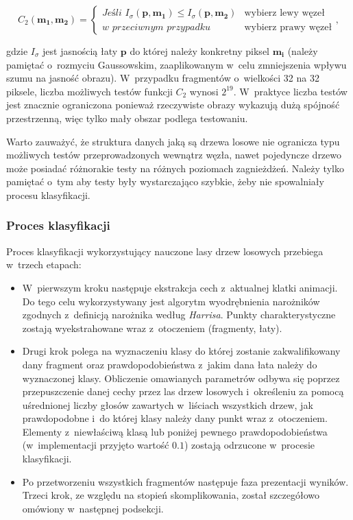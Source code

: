     \[
      C_{2}(\mathbf{m_{1}}, \mathbf{m_{2}}) = \begin{cases}
        \textit{Jeśli } I_{\sigma}(\mathbf{p}, \mathbf{m_{1}}) \leq I_{\sigma}(\mathbf{p}, \mathbf{m_{2}}) & \text{wybierz lewy węzeł} \\
        \textit{w~przeciwnym przypadku} & \text{wybierz prawy węzeł}
      \end{cases},
    \]

    gdzie $I_{\sigma}$ jest jasnością łaty $\mathbf{p}$ do której należy konkretny piksel $\mathbf{m_{i}}$ (należy pamiętać o~rozmyciu Gaussowskim, zaaplikowanym w~celu zmniejszenia wpływu szumu na jasność obrazu). W~przypadku fragmentów o~wielkości 32 na 32 piksele, liczba możliwych testów funkcji $C_{2}$ wynosi $2^{19}$. W~praktyce liczba testów jest znacznie ograniczona ponieważ rzeczywiste obrazy wykazują dużą spójność przestrzenną, więc tylko mały obszar podlega testowaniu.

    Warto zauważyć, że struktura danych jaką są drzewa losowe nie ogranicza typu możliwych testów przeprowadzonych wewnątrz węzła, nawet pojedyncze drzewo może posiadać różnorakie testy na różnych poziomach zagnieżdżeń. Należy tylko pamiętać o~tym aby testy były wystarczająco szybkie, żeby nie spowalniały procesu klasyfikacji.

    \subsubsection{Proces klasyfikacji}
    Proces klasyfikacji wykorzystujący nauczone lasy drzew losowych przebiega w~trzech etapach:
    \begin{itemize}
      \item W~pierwszym kroku następuje ekstrakcja cech z~aktualnej klatki animacji. Do tego celu wykorzystywany jest algorytm wyodrębnienia narożników zgodnych z~definicją narożnika według \textit{Harrisa}. Punkty charakterystyczne zostają wyekstrahowane wraz z~otoczeniem (fragmenty, łaty).
      \item Drugi krok polega na wyznaczeniu klasy do której zostanie zakwalifikowany dany fragment oraz prawdopodobieństwa z~jakim dana łata należy do wyznaczonej klasy. Obliczenie omawianych parametrów odbywa się poprzez przepuszczenie danej cechy przez las drzew losowych i~określeniu za pomocą uśrednionej liczby głosów zawartych w~liściach wszystkich drzew, jak prawdopodobne i~do której klasy należy dany punkt wraz z~otoczeniem. Elementy z~niewłaściwą klasą lub poniżej pewnego prawdopodobieństwa (w~implementacji przyjęto wartość $0.1$) zostają odrzucone w~procesie klasyfikacji.
      \item Po przetworzeniu wszystkich fragmentów następuje faza prezentacji wyników. Trzeci krok, ze względu na stopień skomplikowania, został szczegółowo omówiony w~następnej podsekcji.
    \end{itemize}

